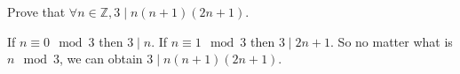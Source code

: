 \documentclass{ctexart}
\newif\ifpreface
\begin{document}
\large
\setlength{\baselineskip}{1.2em}
\date{北京师范大学数学科学学院}
\ifpreface
  
\else
  \maketitle
\fi
{}
\begin{problem}\label{pro:p3.2}
  Prove that \(\forall n \in \mathbb{Z},3 \mid n(n+1)(2n + 1)\).
\end{problem}
\begin{solution}
  If \(n \equiv 0 \mod 3\) then \(3 \mid n\).
  If \(n \equiv 1 \mod 3\) then \(3 \mid 2n+1\).
  So no matter what is \(n \mod 3\), we can obtain \(3 \mid n(n + 1)(2n + 1)\).
\end{solution}
\end{document}
